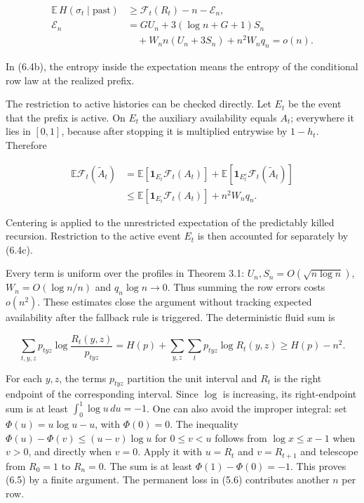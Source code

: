 \documentclass[english,11pt,a4paper]{article}
\begin{document}
\nopagebreak[4]
\[\begin{aligned}
\mathbb E\,H(\sigma_t\mid\mathrm{past})&\ge\mathcal F_t(R_t)-n-\mathcal E_n,\\
\mathcal E_n&=GU_n+3(\log n+G+1)S_n\\
&\quad+W_nn(U_n+3S_n)+n^2W_nq_n=o(n).
\end{aligned}\tag{6.4b}\]

In (6.4b), the entropy inside the expectation means the entropy of the conditional row law at the realized prefix.

The restriction to active histories can be checked directly. Let \(E_t\) be the event that the prefix is active. On \(E_t\) the auxiliary availability equals \(A_t\); everywhere it lies in \([0,1]\), because after stopping it is multiplied entrywise by \(1-h_t\). Therefore

\nopagebreak[4]
\[\begin{aligned}
\mathbb E\mathcal F_t(\widetilde A_t)
&=\mathbb E[\mathbf1_{E_t}\mathcal F_t(A_t)]
+\mathbb E[\mathbf1_{E_t^c}\mathcal F_t(\widetilde A_t)]\\
&\le\mathbb E[\mathbf1_{E_t}\mathcal F_t(A_t)]+n^2W_nq_n.
\end{aligned}\tag{6.4c}\]

Centering is applied to the unrestricted expectation of the predictably killed recursion. Restriction to the active event \(E_t\) is then accounted for separately by (6.4c).

Every term is uniform over the profiles in Theorem 3.1: \(U_n,S_n=O(\sqrt{n\log n})\), \(W_n=O(\log n/n)\) and \(q_n\log n\to0\). Thus summing the row errors costs \(o(n^2)\). These estimates close the argument without tracking expected availability after the fallback rule is triggered. The deterministic fluid sum is

\nopagebreak[4]
\[\sum_{t,y,z}p_{tyz}\log\frac{R_t(y,z)}{p_{tyz}}
=H(p)+\sum_{y,z}\sum_t p_{tyz}\log R_t(y,z)\ge H(p)-n^2.\tag{6.5}\]

For each \(y,z\), the terms \(p_{tyz}\) partition the unit interval and \(R_t\) is the right endpoint of the corresponding interval. Since \(\log\) is increasing, its right-endpoint sum is at least \(\int_0^1\log u\,du=-1\). One can also avoid the improper integral: set \(\Phi(u)=u\log u-u\), with \(\Phi(0)=0\). The inequality \(\Phi(u)-\Phi(v)\le(u-v)\log u\) for \(0\le v<u\) follows from \(\log x\le x-1\) when \(v>0\), and directly when \(v=0\). Apply it with \(u=R_t\) and \(v=R_{t+1}\) and telescope from \(R_0=1\) to \(R_n=0\). The sum is at least \(\Phi(1)-\Phi(0)=-1\). This proves (6.5) by a finite argument. The permanent loss in (5.6) contributes another \(n\) per row.
\end{document}
